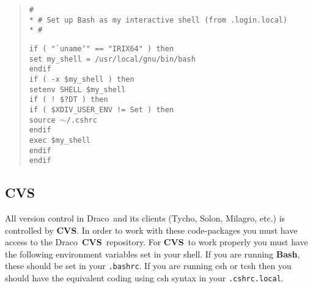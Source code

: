 \documentclass[10pt]{nmemo}
\newcommand{\comp}[1]{\normalfont\normalsize\texttt{#1}}
\newcommand{\draco}{{\normalfont\sffamily Draco}}
\newcommand{\tycho}{{\normalfont\sffamily Tycho}}
\newcommand{\solon}{{\normalfont\sffamily Solon}}
\newcommand{\milagro}{{\normalfont\sffamily Milagro}}
\newcommand{\cvs}{{\normalfont\bfseries CVS}}
\newcommand{\bash}{{\normalfont\bfseries Bash}}
\begin{document}
\footnotesize

\begin{verse}
\texttt{\#\\*
\# Set up Bash as my interactive shell (from .login.local)\\*
\#
}

\texttt{if ( "`uname`" == "IRIX64" ) then \\
\hspace*{0.25in} set my\_shell = /usr/local/gnu/bin/bash \\
endif \\
}
%
\texttt{if ( -x \$my\_shell ) then \\
\hspace*{0.25in}   setenv SHELL \$my\_shell \\
\hspace*{0.25in}   if ( ! \${?DT} ) then \\
\hspace*{0.5in}      if ( \$XDIV\_USER\_ENV != Set ) then \\
\hspace*{0.75in}         source $\sim$/.cshrc \\
\hspace*{0.5in}      endif \\
\hspace*{0.5in}      exec \$my\_shell \\
\hspace*{0.25in}   endif \\
endif
} 
\end{verse}

\normalsize

\subsection{CVS}

All version control in \draco\ and its clients (\tycho, \solon,
\milagro, etc.) is controlled by \cvs.  In order to work with these
code-packages you must have access to the \draco\ \cvs\ repository.
For \cvs\ to work properly you must have the following environment
variables set in your shell.  If you are running \bash, these should
be set in your \comp{.bashrc}.  If you are running csh or tcsh then
you should have the equivalent coding using csh syntax in your
\comp{.cshrc.local}.
\end{document}
